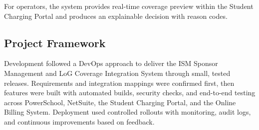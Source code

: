        For operators, the system provides real-time coverage preview within the Student Charging Portal and produces an explainable decision with reason codes.
        
        \subsection{Project Framework}
        
        Development followed a DevOps approach to deliver the ISM Sponsor Management and LoG Coverage Integration System through small, tested releases. Requirements and integration mappings were confirmed first, then features were built with automated builds, security checks, and end-to-end testing across PowerSchool, NetSuite, the Student Charging Portal, and the Online Billing System. Deployment used controlled rollouts with monitoring, audit logs, and continuous improvements based on feedback.
      
